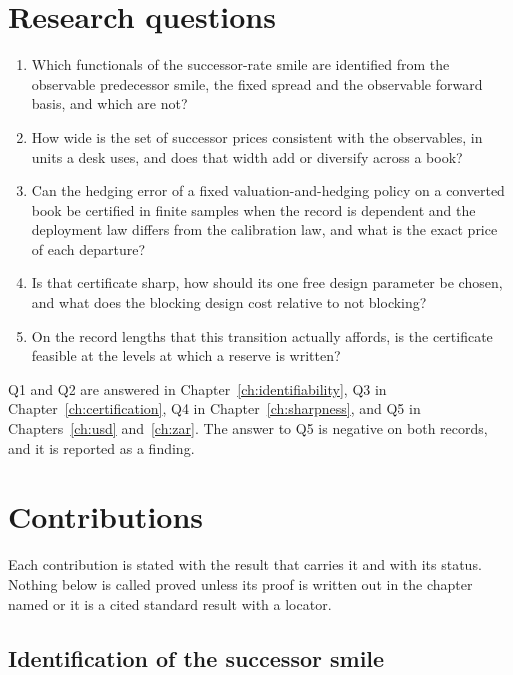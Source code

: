 \documentclass[../../../main.tex]{subfiles}
\begin{document}
\section{Research questions}\label{sec:intro-questions}

\begin{enumerate}[label=\textbf{Q\arabic*.},leftmargin=2.4\parindent]
\item Which functionals of the successor-rate smile are identified from the observable predecessor smile, the fixed spread and the observable forward basis, and which are not?
\item How wide is the set of successor prices consistent with the observables, in units a desk uses, and does that width add or diversify across a book?
\item Can the hedging error of a fixed valuation-and-hedging policy on a converted book be certified in finite samples when the record is dependent and the deployment law differs from the calibration law, and what is the exact price of each departure?
\item Is that certificate sharp, how should its one free design parameter be chosen, and what does the blocking design cost relative to not blocking?
\item On the record lengths that this transition actually affords, is the certificate feasible at the levels at which a reserve is written?
\end{enumerate}

Q1 and Q2 are answered in Chapter~\ref{ch:identifiability}, Q3 in Chapter~\ref{ch:certification}, Q4 in Chapter~\ref{ch:sharpness}, and Q5 in Chapters~\ref{ch:usd} and~\ref{ch:zar}. The answer to Q5 is negative on both records, and it is reported as a finding.

\section{Contributions}\label{sec:intro-contributions}

Each contribution is stated with the result that carries it and with its status. Nothing below is called proved unless its proof is written out in the chapter named or it is a cited standard result with a locator.

\subsection{Identification of the successor smile}
\end{document}
